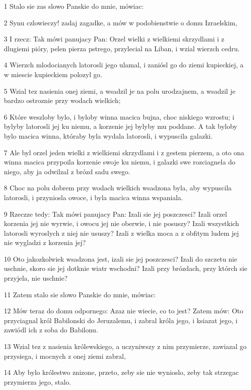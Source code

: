 \par 1 Stalo sie zas slowo Panskie do mnie, mówiac:
\par 2 Synu czlowieczy! zadaj zagadke, a mów w podobienstwie o domu Izraelskim,
\par 3 I rzecz: Tak mówi panujacy Pan: Orzel wielki z wielkiemi skrzydlami i z dlugiemi pióry, pelen pierza pstrego, przylecial na Liban, i wzial wierzch cedru.
\par 4 Wierzch mlodocianych latorosli jego ulamal, i zaniósl go do ziemi kupieckiej, a w miescie kupieckiem polozyl go.
\par 5 Wzial tez nasienia onej ziemi, a wsadzil je na polu urodzajnem, a wsadzil je bardzo ostroznie przy wodach wielkich;
\par 6 Które weszloby bylo, i byloby winna macica bujna, choc niskiego wzrostu; i bylyby latorosli jej ku niemu, a korzenie jej bylyby mu poddane. A tak byloby bylo macica winna, któraby byla wydala latorosli, i wypuscila galazki.
\par 7 Ale byl orzel jeden wielki z wielkiemi skrzydlami i z gestem pierzem, a oto ona winna macica przypoila korzenie swoje ku niemu, i galazki swe rozciagnela do niego, aby ja odwilzal z brózd sadu swego.
\par 8 Choc na polu dobrem przy wodach wielkich wsadzona byla, aby wypuscila latorosli, i przyniosla owoce, i byla macica winna wspaniala.
\par 9 Rzeczze tedy: Tak mówi panujacy Pan: Izali sie jej poszczesci? Izali orzel korzenia jej nie wyrwie, i owocu jej nie oberwie, i nie posuszy? Izali wszystkich latorosli wyroslych z niej nie ususzy? Izali z wielka moca a z obfitym ludem jej nie wygladzi z korzenia jej?
\par 10 Oto jakozkolwiek wsadzona jest, izali sie jej poszczesci? Izali do szczetu nie uschnie, skoro sie jej dotknie wiatr wschodni? Izali przy brózdach, przy którch sie przyjela, nie uschnie?
\par 11 Zatem stalo sie slowo Panskie do mnie, mówiac:
\par 12 Mów teraz do domu odpornego: Azaz nie wiecie, co to jest? Zatem mów: Oto przyciagnal król Babilonski do Jeruzalemu, i zabral króla jego, i ksiazat jego, i zawiódl ich z soba do Babilonu.
\par 13 Wzial tez z nasienia królewskiego, a uczyniwszy z nim przymierze, zawiazal go przysiega, i mocnych z onej ziemi zabral,
\par 14 Aby bylo królestwo znizone, przeto, zeby sie nie wynioslo, zeby tak strzegac przymierza jego, stalo.
